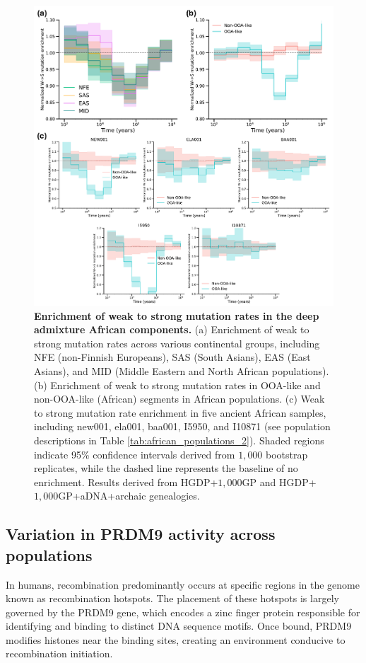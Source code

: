 \begin{figure}
    \centering
    \includegraphics[width=\linewidth]{figures/gb_deepadmix/gb_real_deep_8.pdf}
    \captionsetup{width=\textwidth+3cm}
    \caption{
    \footnotesize
    \textbf{Enrichment of weak to strong mutation rates in the deep admixture African components.} (a) Enrichment of weak to strong mutation rates across various continental groups, including NFE (non-Finnish Europeans), SAS (South Asians), EAS (East Asians), and MID (Middle Eastern and North African populations). (b) Enrichment of weak to strong mutation rates in OOA-like and non-OOA-like (African) segments in African populations. (c) Weak to strong mutation rate enrichment in five ancient African samples, including new001, ela001, baa001, I5950, and I10871 (see population descriptions in Table \ref{tab:african_populations_2}). Shaded regions indicate 95\% confidence intervals derived from $1{,}000$ bootstrap replicates, while the dashed line represents the baseline of no enrichment. Results derived from HGDP+$1{,}000$GP and HGDP+$1{,}000$GP+aDNA+archaic genealogies.
    }
\label{fig:gb-mut-ws-deep}
\end{figure}

\clearpage

\subsection{Variation in PRDM9 activity across populations}
In humans, recombination predominantly occurs at specific regions in the genome known as recombination hotspots. The placement of these hotspots is largely governed by the PRDM9 gene, which encodes a zinc finger protein responsible for identifying and binding to distinct DNA sequence motifs. Once bound, PRDM9 modifies histones near the binding sites, creating an environment conducive to recombination initiation.

